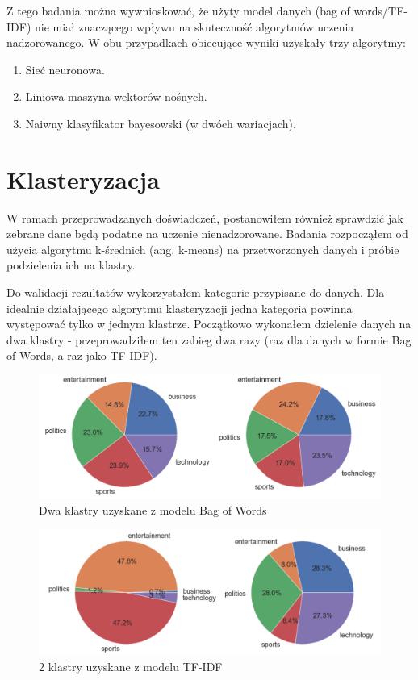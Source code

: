 Z tego badania można wywnioskować, że użyty model danych (bag of words/TF-IDF) nie miał znaczącego wpływu na skuteczność algorytmów uczenia nadzorowanego. W obu przypadkach obiecujące wyniki uzyskały trzy algorytmy:
\begin{enumerate}
    \item Sieć neuronowa.
    \item Liniowa maszyna wektorów nośnych.
    \item Naiwny klasyfikator bayesowski (w dwóch wariacjach).
\end{enumerate}

\section{Klasteryzacja}

W ramach przeprowadzanych doświadczeń, postanowiłem również sprawdzić jak zebrane dane będą podatne na uczenie nienadzorowane. Badania rozpocząłem od użycia algorytmu k-średnich (ang. k-means) na przetworzonych danych i próbie podzielenia ich na klastry.

Do walidacji rezultatów wykorzystałem kategorie przypisane do danych. Dla idealnie działającego algorytmu klasteryzacji jedna kategoria powinna występować tylko w jednym klastrze. Początkowo wykonałem dzielenie danych na dwa klastry - przeprowadziłem ten zabieg dwa razy (raz dla danych w formie Bag of Words, a raz jako TF-IDF).

    \begin{figure}[H]
    \includegraphics[width=\textwidth]{images/analiza/klast_bow.png}
    \centering
    \caption{Dwa klastry uzyskane z modelu Bag of Words}
    \label{fig:cls1}
    \end{figure} 
    
    \begin{figure}[H]
    \includegraphics[width=\textwidth]{images/analiza/klast_tfidf.png}
    \centering
    \caption{2 klastry uzyskane z modelu TF-IDF}
        \label{fig:cls2}
    \end{figure} 

